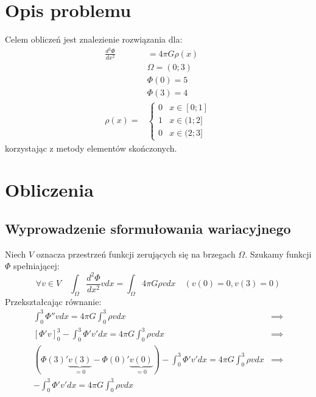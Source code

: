 \documentclass[11pt,a4paper]{article}
\begin{document}
\section{Opis problemu}
Celem obliczeń jest znalezienie rozwiązania dla:
\begin{equation}
    \begin{split}
        \frac{d^2 \Phi}{dx^2} &= 4\pi G \rho(x)
        \\
        &\Omega = (0; 3)
        \\
        &\Phi(0) = 5
        \\
        &\Phi(3) = 4
        \\
        \rho(x) = &
        \begin{cases}
            0 & x \in [0; 1] \\
            1 & x \in (1; 2] \\
            0 & x \in (2; 3]
        \end{cases}
    \end{split}
\end{equation}
korzystając z metody elementów skończonych.

\section{Obliczenia}
\subsection{Wyprowadzenie sformułowania wariacyjnego}
Niech $V$ oznacza przestrzeń funkcji zerujących
się na brzegach $\Omega$.
Szukamy funkcji $\Phi$ spełniającej:
\begin{equation}
    \forall v \in V \quad \int_{\Omega}^{} \frac{d^2 \Phi}{dx^2}v dx 
    = \int_{\Omega}^{} 4\pi G \rho v dx \quad (v(0) = 0, v(3) = 0)
\end{equation}
Przekształcając równanie:
\begin{equation}
    \begin{split}
        \int_{0}^{3} \Phi''vdx = 4\pi G\int_{0}^{3}\rho vdx 
        &\implies
        \\
        [\Phi'v]^3_0 - \int_{0}^{3} \Phi'v'dx = 4\pi G \int_{0}^{3}\rho vdx
        &\implies
        \\
        (\Phi(3)'\underbrace{v(3)}_{=0} - \Phi(0)'\underbrace{v(0)}_{=0}) 
        - \int_{0}^{3} \Phi'v'dx = 4\pi G \int_{0}^{3}\rho vdx
        &\implies
        \\
        - \int_{0}^{3} \Phi'v'dx = 4\pi G \int_{0}^{3}\rho vdx
    \end{split}
\end{equation}
\end{document}
